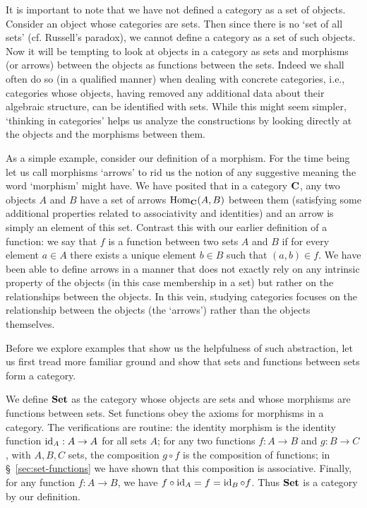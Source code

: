 It is important to note that we have not defined a category as a set of objects.
Consider an object whose categories are sets. Then since there is no `set of all
sets' (cf. Russell's paradox), we cannot define a category as a set of such
objects. Now it will be tempting to look at objects in a category as sets and
morphisms (or arrows) between the objects as functions between the sets. Indeed
we shall often do so (in a qualified manner) when dealing with concrete
categories, i.e., categories whose objects, having removed any additional data
about their algebraic structure, can be identified with sets. While this might
seem simpler, `thinking in categories' helps us analyze the constructions by
looking directly at the objects and the morphisms between them.

As a simple example, consider our definition of a morphism. For the time being
let us call morphisms `arrows' to rid us the notion of any suggestive meaning
the word `morphism' might have. We have posited that in a category \(\mathbf{C}\),
any two objects \(A\) and \(B\) have a set of arrows \(\operatorname{Hom}_{\mathbf{C}}(A, B)\)
between them (satisfying some additional properties related to associativity and
identities) and an arrow is simply an element of this set. Contrast this with
our earlier definition of a function: we say that \(f\) is a function between
two sets \(A\) and \(B\) if for every element \(a \in A\) there exists a unique
element \(b \in B\) such that \((a, b) \in f\). We have been able to define
arrows in a manner that does not exactly rely on any intrinsic property of the
objects (in this case membership in a set) but rather on the relationships
between the objects. In this vein, studying categories focuses on the
relationship between the objects (the `arrows') rather than the objects
themselves.

Before we explore examples that show us the helpfulness of such abstraction, let
us first tread more familiar ground and show that sets and functions between
sets form a category.

\begin{example}
    We define \(\mathbf{Set}\) as the category whose objects are sets and whose
    morphisms are functions between sets. Set functions obey the axioms for
    morphisms in a category. The verifications are routine: the identity
    morphism is the identity function \(\operatorname{id}_A : A \to A\) for all sets \(A\);
    for any two functions \(f: A \to B\) and \(g: B \to C\), with \(A, B, C\)
    sets, the composition \(g \circ f\) is the composition of functions; in
    \S~\ref{sec:set-functions} we have shown that this composition is
    associative. Finally, for any function \(f: A \to B\), we have \(f \circ
    \operatorname{id}_A = f = \operatorname{id}_B \circ f\). Thus \(\mathbf{Set}\) is a category by our definition.
\end{example}

